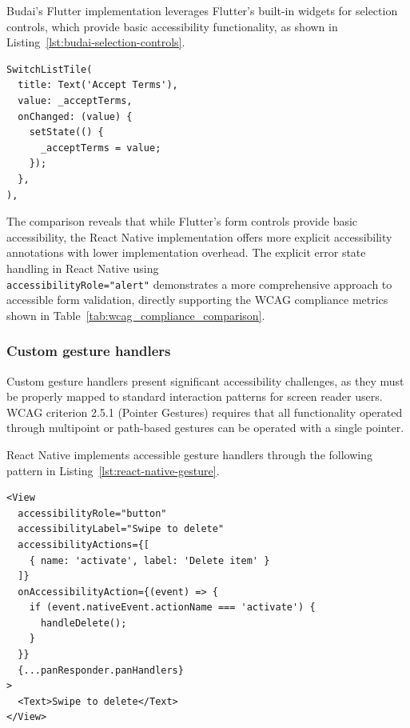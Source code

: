 Budai's Flutter implementation leverages Flutter's built-in widgets for selection controls, which provide basic accessibility functionality, as shown in Listing~\ref{lst:budai-selection-controls}.

\begin{lstlisting}[style=DartStyle, caption=Selection controls in Budai's Flutter code, label=lst:budai-selection-controls]
SwitchListTile(
  title: Text('Accept Terms'),
  value: _acceptTerms,
  onChanged: (value) {
    setState(() {
      _acceptTerms = value;
    });
  },
),
\end{lstlisting}

\FloatBarrier

The comparison reveals that while Flutter's form controls provide basic accessibility, the React Native implementation offers more explicit accessibility annotations with lower implementation overhead. The explicit error state handling in React Native using \\ \texttt{accessibilityRole="alert"} demonstrates a more comprehensive approach to accessible form validation, directly supporting the WCAG compliance metrics shown in Table~\ref{tab:wcag_compliance_comparison}.

\subsubsection{Custom gesture handlers}
\label{subsubsec:gesture-handlers}

Custom gesture handlers present significant accessibility challenges, as they must be properly mapped to standard interaction patterns for screen reader users. WCAG criterion 2.5.1 (Pointer Gestures) requires that all functionality operated through multipoint or path-based gestures can be operated with a single pointer.

React Native implements accessible gesture handlers through the following pattern in Listing~\ref{lst:react-native-gesture}.

\begin{lstlisting}[style=ReactNativeStyle, caption=Accessible gesture handler in React Native, label=lst:react-native-gesture]
<View
  accessibilityRole="button"
  accessibilityLabel="Swipe to delete"
  accessibilityActions={[
    { name: 'activate', label: 'Delete item' }
  ]}
  onAccessibilityAction={(event) => {
    if (event.nativeEvent.actionName === 'activate') {
      handleDelete();
    }
  }}
  {...panResponder.panHandlers}
>
  <Text>Swipe to delete</Text>
</View>
\end{lstlisting}


